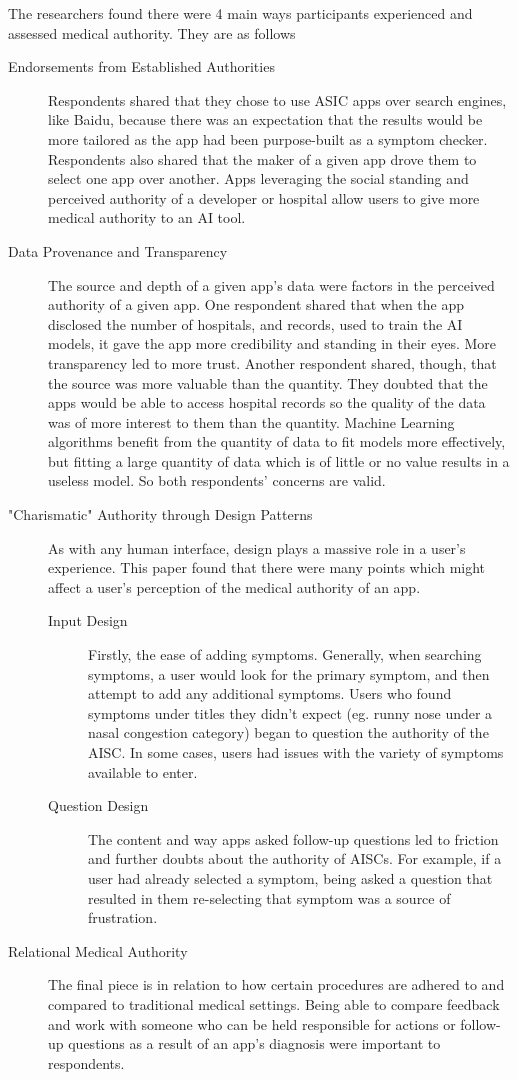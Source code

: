 \documentclass[a4paper]{article}
\begin{document}
The researchers found there were 4 main ways participants experienced and assessed medical authority. They are as follows
\begin{description}
    \item[Endorsements from Established Authorities] Respondents shared that they chose to use ASIC apps over search engines, like Baidu, because there was an expectation that the results would be more tailored as the app had been purpose-built as a symptom checker. Respondents also shared that the maker of a given app drove them to select one app over another. Apps leveraging the social standing and perceived authority of a developer or hospital allow users to give more medical authority to an AI tool.
    \item[Data Provenance and Transparency] The source and depth of a given app's data were factors in the perceived authority of a given app. One respondent shared that when the app disclosed the number of hospitals, and records, used to train the AI models, it gave the app more credibility and standing in their eyes. More transparency led to more trust. Another respondent shared, though, that the source was more valuable than the quantity. They doubted that the apps would be able to access hospital records so the quality of the data was of more interest to them than the quantity. Machine Learning algorithms benefit from the quantity of data to fit models more effectively, but fitting a large quantity of data which is of little or no value results in a useless model. So both respondents' concerns are valid.
    \item["Charismatic" Authority through Design Patterns] As with any human interface, design plays a massive role in a user's experience. This paper found that there were many points which might affect a user's perception of the medical authority of an app.
    \begin{description}
        \item[Input Design] Firstly, the ease of adding symptoms. Generally, when searching symptoms, a user would look for the primary symptom, and then attempt to add any additional symptoms. Users who found symptoms under titles they didn't expect (eg. runny nose under a nasal congestion category) began to question the authority of the AISC. In some cases, users had issues with the variety of symptoms available to enter.
        \item[Question Design] The content and way apps asked follow-up questions led to friction and further doubts about the authority of AISCs. For example, if a user had already selected a symptom, being asked a question that resulted in them re-selecting that symptom was a source of frustration.
    \end{description}
    \item[Relational Medical Authority] The final piece is in relation to how certain procedures are adhered to and compared to traditional medical settings. Being able to compare feedback and work with someone who can be held responsible for actions or follow-up questions as a result of an app's diagnosis were important to respondents.
\end{description}
\end{document}
